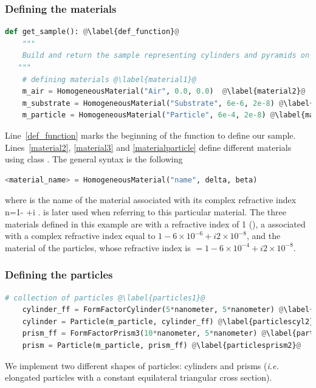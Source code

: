 \subsubsection{Defining the materials} 
\begin{lstlisting}[language=python, style=eclipseboxed,name=ex1,nolol]
def get_sample(): @\label{def_function}@
    """
    Build and return the sample representing cylinders and pyramids on top of substrate without interference.
   """
    # defining materials @\label{material1}@
    m_air = HomogeneousMaterial("Air", 0.0, 0.0)  @\label{material2}@
    m_substrate = HomogeneousMaterial("Substrate", 6e-6, 2e-8) @\label{material3}@
    m_particle = HomogeneousMaterial("Particle", 6e-4, 2e-8) @\label{materialparticle}@

\end{lstlisting}
Line~\ref{def_function} marks the beginning of the
function to define our sample. Lines~\ref{material2}, \ref{material3} and \ref{materialparticle} define different
materials using class . The general syntax is the following 
\begin{lstlisting}[language=python, style=eclipse,numbers=none]
<material_name> = HomogeneousMaterial("name", delta, beta)
\end{lstlisting}
where  is the name of the
material associated with its complex refractive index
n=1- +i .  is later used when
referring to this particular material. The three materials defined in this example are  with a refractive
index of 1 (), a  associated with a complex refractive index
equal to $1-6\times 10^{-6} +i2\times 10^{-8} $, and the material of the particles, whose refractive index is $=1-6\times 10^{-4}+i2\times 10^{-8}$.


%
\subsubsection{Defining the particles}
\begin{lstlisting}[language=python,style=eclipseboxed,name=ex1,nolol]
    # collection of particles @\label{particles1}@
    cylinder_ff = FormFactorCylinder(5*nanometer, 5*nanometer) @\label{particlescyl1}@
    cylinder = Particle(m_particle, cylinder_ff) @\label{particlescyl2}@
    prism_ff = FormFactorPrism3(10*nanometer, 5*nanometer) @\label{particlesprism1}@
    prism = Particle(m_particle, prism_ff) @\label{particlesprism2}@
\end{lstlisting}
We implement two different shapes of particles: cylinders and
prisms (\textit{i.e.} elongated particles with a constant equilateral triangular cross section).
 
